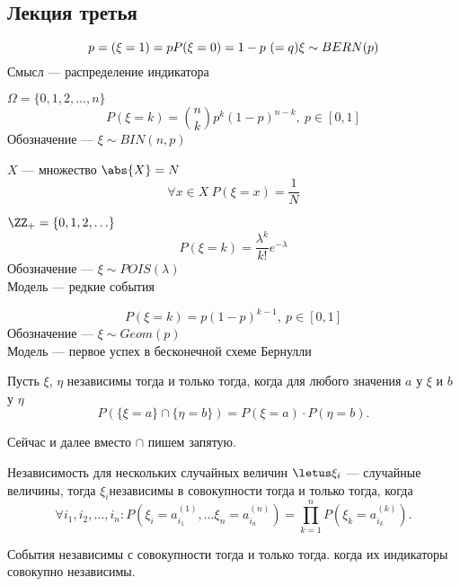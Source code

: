 \subsection{Лекция третья}

\begin{definition}
    \[p={(\xi=1)=p} \\
    P(\xi = 0)=1-p\ (=q) \\
    \xi \sim BERN(p)\]
    Смысл --- распределение индикатора
\end{definition}

\begin{definition}
    $\Omega = \{0, 1, 2, \ldots, n\}$
    \[P(\xi = k) = \binom{n}{k}p^k(1-p)^{n-k},\ p \in [0, 1]\]
    Обозначение --- $\xi \sim BIN(n, p)$
\end{definition}

\begin{definition}
    $X$ --- множество $\abs{X} = N$
    \[\forall x \in X \ P(\xi = x) = \frac{1}{N}\] 
\end{definition}


\begin{definition}
    $\ZZ_+ = \{0, 1, 2, \ldots \}$
    \[P(\xi = k) = \frac{\lambda^k}{k!}e^{-\lambda}\]
    Обозначение --- $\xi \sim POIS(\lambda)$\\
    Модель --- редкие события
\end{definition}

\begin{definition}
    \[P(\xi = k) = p(1-p)^{k-1},\ p \in [0, 1]\]
    Обозначение --- $\xi \sim Geom(p)$\\
    Модель --- первое успех в бесконечной схеме Бернулли 
\end{definition}

\begin{definition}
    Пусть $\xi$, $\eta$ независимы тогда и только тогда, когда для любого значения $a$ у $\xi$ и $b$ у $\eta$ 
    \[P(\{\xi=a\} \cap \{\eta=b\}) = P(\xi=a) \cdot P(\eta=b).\]

    \begin{remark}
        Сейчас и далее вместо $\cap$ пишем запятую.
    \end{remark}
    
    Независимость для нескольких случайных величин 
    $\letus \xi_i$ --- случайные величины, тогда $\xi_i$независимы в совокупности тогда и только тогда, когда 
    \[\forall i_1, i_2, \ldots, i_n : P(\xi_i=a_{i_1}^{(1)}, \ldots \xi_n=a_{i_n}^{(n)}) = \prod_{k=1}^n P(\xi_k=a_{i_k}^{(k)}).\]

    События независимы с совокупности тогда и только тогда. когда их индикаторы совокупно независимы.
\end{definition}


